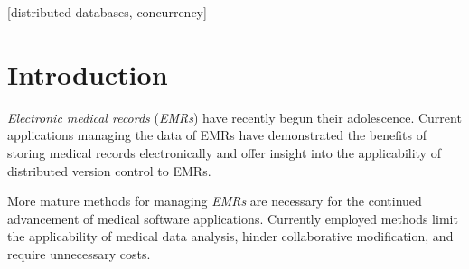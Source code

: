 \documentclass{acm_proc_article-sp}
\begin{document}


\maketitle
\begin{abstract}
This paper describes the applicability of \textit{distributed version control} to 
\textit{electronic medical records}. Demand for more efficient and effective methods
of managing \textit{electronic medical records} is growing.  
While \textit{distributed database systems} have been successfully utilized in leisure 
oriented applications they generally do not guarantee data integrity and in turn are 
not suited for \textit{electronic medical records}.  
\textit{Distributed version control} systems are designed for collaborative modification of electronic
data while maintaining data integrity and may serve an efficient and effective method 
of managing \textit{electronic medical records}.
\end{abstract}

[distributed databases, concurrency]

\terms{}


\section{Introduction}
\textit{Electronic medical records} (\textit{EMRs}) have recently begun their adolescence.  
Current applications managing the data of EMRs have demonstrated the benefits
of storing medical records electronically and offer insight into the 
applicability of distributed version control to EMRs.

More mature methods for managing \textit{EMRs} are necessary for the continued advancement of
medical software applications.  Currently employed methods limit the applicability of medical 
data analysis, hinder collaborative modification, and require unnecessary costs.
\end{document}
